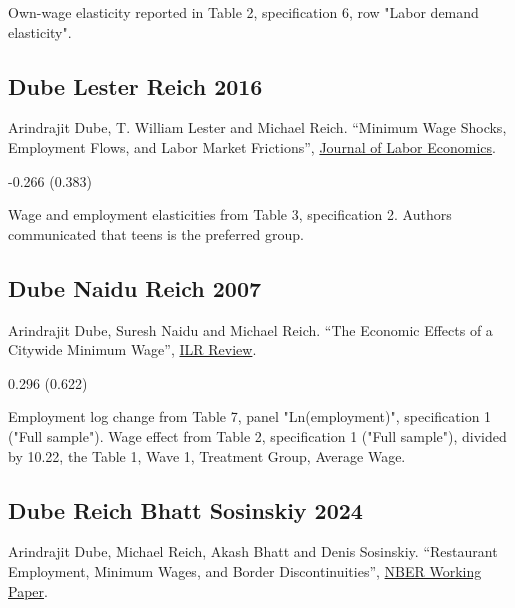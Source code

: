  Own-wage elasticity reported in Table 2, specification 6, row "Labor demand elasticity".

\subsection*{Dube Lester Reich 2016}
\vspace{-0.7em}

\noindent Arindrajit Dube, T. William Lester and Michael Reich. ``Minimum Wage Shocks, Employment Flows, and Labor Market Frictions'', \href{https://doi.org/10.1086/685449}{Journal of Labor Economics}.

\vspace{0.7em}

 -0.266 (0.383)

\vspace{0.7em}

 Wage and employment elasticities from Table 3, specification 2. Authors communicated that teens is the preferred group.

\subsection*{Dube Naidu Reich 2007}
\vspace{-0.7em}

\noindent Arindrajit Dube, Suresh Naidu and Michael Reich. ``The Economic Effects of a Citywide Minimum Wage'', \href{https://doi.org/10.1177/001979390706000404}{ILR Review}.

\vspace{0.7em}

 0.296 (0.622)

\vspace{0.7em}

 Employment log change from Table 7, panel "Ln(employment)", specification 1 ("Full sample"). Wage effect from Table 2, specification 1 ("Full sample"), divided by 10.22, the Table 1, Wave 1, Treatment Group, Average Wage.

\subsection*{Dube Reich Bhatt Sosinskiy 2024}
\vspace{-0.7em}

\noindent Arindrajit Dube, Michael Reich, Akash Bhatt and Denis Sosinskiy. ``Restaurant Employment, Minimum Wages, and Border Discontinuities'', \href{http://www.nber.org/papers/w32902}{NBER Working Paper}.

